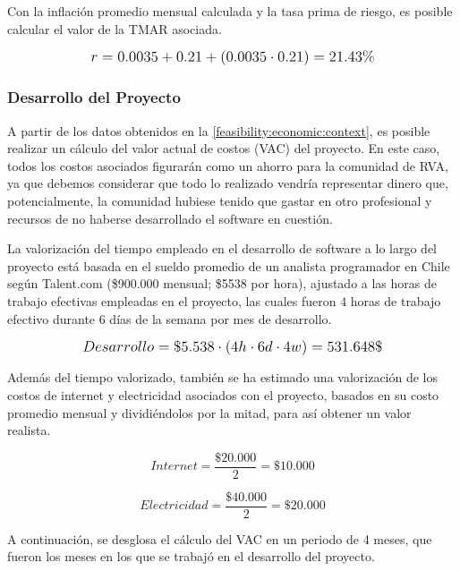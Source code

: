 Con la inflación promedio mensual calculada y la tasa prima de riesgo, es posible calcular el valor de la TMAR asociada.

\[
\mathlarger{
	r = 0.0035+0.21+(0.0035\cdot0.21) = 21.43\%
}
\]

\subsubsection{Desarrollo del Proyecto}
A partir de los datos obtenidos en la \autoref{feasibility:economic:context}, es posible realizar un cálculo del valor actual de costos (VAC) del proyecto. En este caso, todos los costos asociados figurarán como un ahorro para la comunidad de RVA, ya que debemos considerar que todo lo realizado vendría representar dinero que, potencialmente, la comunidad hubiese tenido que gastar en otro profesional y recursos de no haberse desarrollado el software en cuestión.

La valorización del tiempo empleado en el desarrollo de software a lo largo del proyecto está basada en el sueldo promedio de un analista programador en Chile según Talent.com (\$900.000 mensual; \$5538 por hora), ajustado a las horas de trabajo efectivas empleadas en el proyecto, las cuales fueron 4 horas de trabajo efectivo durante 6 días de la semana por mes de desarrollo.

\[
\mathlarger{
	Desarrollo = \$5.538 \cdot \left(4h\cdot6d\cdot4w\right) = 531.648\$
}
\]

Además del tiempo valorizado, también se ha estimado una valorización de los costos de internet y electricidad asociados con el proyecto, basados en su costo promedio mensual y dividiéndolos por la mitad, para así obtener un valor realista.

\[
	Internet = \frac{\$20.000}{2} = \$10.000
\]

\[
	Electricidad = \frac{\$40.000}{2} = \$20.000
\]

A continuación, se desglosa el cálculo del VAC en un periodo de 4 meses, que fueron los meses en los que se trabajó en el desarrollo del proyecto.


